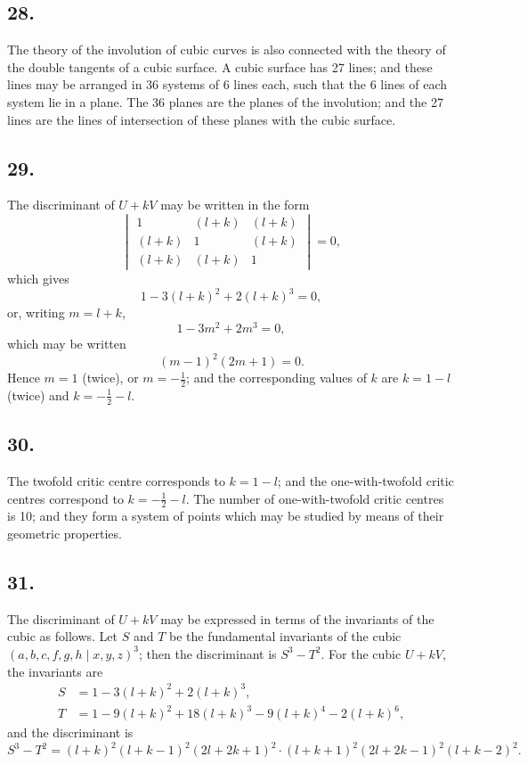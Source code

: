 \documentclass[11pt,a4paper]{article}
\theoremstyle{definition}
\begin{document}
\subsection*{28.}

The theory of the involution of cubic curves is also connected with the theory of the
double tangents of a cubic surface. A cubic surface has 27 lines; and these lines may be
arranged in 36 systems of 6 lines each, such that the 6 lines of each system lie in a plane.
The 36 planes are the planes of the involution; and the 27 lines are the lines of intersection
of these planes with the cubic surface.

\newpage
\subsection*{29.}

The discriminant of $U + kV$ may be written in the form
\[
\begin{vmatrix}
1 & (l + k) & (l + k) \\
(l + k) & 1 & (l + k) \\
(l + k) & (l + k) & 1
\end{vmatrix}
= 0,
\]
which gives
\[
1 - 3(l + k)^{2} + 2(l + k)^{3} = 0,
\]
or, writing $m = l + k$,
\[
1 - 3m^{2} + 2m^{3} = 0,
\]
which may be written
\[
(m - 1)^{2}(2m + 1) = 0.
\]
Hence $m = 1$ (twice), or $m = -\frac{1}{2}$; and the corresponding values of $k$ are $k = 1 - l$ (twice)
and $k = -\frac{1}{2} - l$.

\subsection*{30.}

The twofold critic centre corresponds to $k = 1 - l$; and the one-with-twofold critic
centres correspond to $k = -\frac{1}{2} - l$. The number of one-with-twofold critic centres is 10;
and they form a system of points which may be studied by means of their geometric
properties.

\newpage
\subsection*{31.}

The discriminant of $U + kV$ may be expressed in terms of the invariants of the cubic
as follows. Let $S$ and $T$ be the fundamental invariants of the cubic $(a, b, c, f, g, h \mid x, y, z)^{3}$;
then the discriminant is $S^{3} - T^{2}$. For the cubic $U + kV$, the invariants are
\begin{align*}
S &= 1 - 3(l + k)^{2} + 2(l + k)^{3},\\
T &= 1 - 9(l + k)^{2} + 18(l + k)^{3} - 9(l + k)^{4} - 2(l + k)^{6},
\end{align*}
and the discriminant is
\[
S^{3} - T^{2} = (l + k)^{2}(l + k - 1)^{2}(2l + 2k + 1)^{2}
\cdot (l + k + 1)^{2}(2l + 2k - 1)^{2}(l + k - 2)^{2}.
\]
\end{document}
